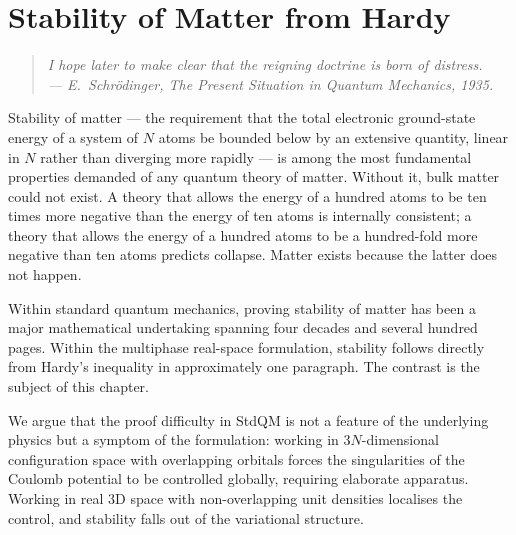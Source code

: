 \chapter{Stability of Matter from Hardy}\label{ch:som}

\begin{quote}
\itshape I hope later to make clear that the reigning doctrine is born of distress.\\
\normalfont\hfill --- E.~Schr\"odinger, \emph{The Present Situation in Quantum Mechanics}, 1935.
\end{quote}
\bigskip

Stability of matter --- the requirement that the total electronic ground-state energy of a system of $N$ atoms be bounded below by an extensive quantity, linear in $N$ rather than diverging more rapidly --- is among the most fundamental properties demanded of any quantum theory of matter. Without it, bulk matter could not exist. A theory that allows the energy of a hundred atoms to be ten times more negative than the energy of ten atoms is internally consistent; a theory that allows the energy of a hundred atoms to be a hundred-fold more negative than ten atoms predicts collapse. Matter exists because the latter does not happen.

Within standard quantum mechanics, proving stability of matter has been a major mathematical undertaking spanning four decades and several hundred pages. Within the multiphase real-space formulation, stability follows directly from Hardy's inequality in approximately one paragraph. The contrast is the subject of this chapter.

We argue that the proof difficulty in StdQM is not a feature of the underlying physics but a symptom of the formulation: working in $3N$-dimensional configuration space with overlapping orbitals forces the singularities of the Coulomb potential to be controlled globally, requiring elaborate apparatus. Working in real 3D space with non-overlapping unit densities localises the control, and stability falls out of the variational structure.

